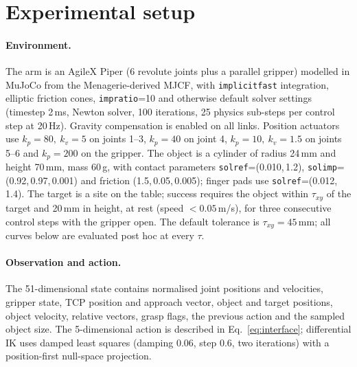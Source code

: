 \documentclass{article}
\begin{document}
\section{Experimental setup}
\label{sec:setup}

\paragraph{Environment.}
The arm is an AgileX Piper (6 revolute joints plus a parallel gripper) modelled
in MuJoCo \citep{todorov2012mujoco} from the Menagerie-derived MJCF, with
\texttt{implicitfast} integration, elliptic friction cones, \texttt{impratio}=10
and otherwise default solver settings (timestep 2\,ms, Newton solver, 100
iterations, 25 physics sub-steps per control step at 20\,Hz). Gravity
compensation is enabled on all links. Position actuators use $k_p{=}80,\ k_v{=}5$
on joints 1--3, $k_p{=}40$ on joint 4, $k_p{=}10,\ k_v{=}1.5$ on joints 5--6 and
$k_p{=}200$ on the gripper. The object is a cylinder of radius 24\,mm and height
70\,mm, mass 60\,g, with contact parameters \texttt{solref}=(0.010,\,1.2),
\texttt{solimp}=(0.92,\,0.97,\,0.001) and friction (1.5,\,0.05,\,0.005); finger
pads use \texttt{solref}=(0.012,\,1.4). The target is a site on the table;
success requires the object within $\tau_{xy}$ of the target and 20\,mm in
height, at rest (speed $<0.05$\,m/s), for three consecutive control steps with
the gripper open. The default tolerance is $\tau_{xy}{=}45$\,mm; all curves below
are evaluated post hoc at every $\tau$.

\paragraph{Observation and action.}
The 51-dimensional state contains normalised joint positions and velocities,
gripper state, TCP position and approach vector, object and target positions,
object velocity, relative vectors, grasp flags, the previous action and the
sampled object size. The 5-dimensional action is described in
Eq.~\ref{eq:interface}; differential IK uses damped least squares (damping 0.06,
step 0.6, two iterations) with a position-first null-space projection.
\end{document}
